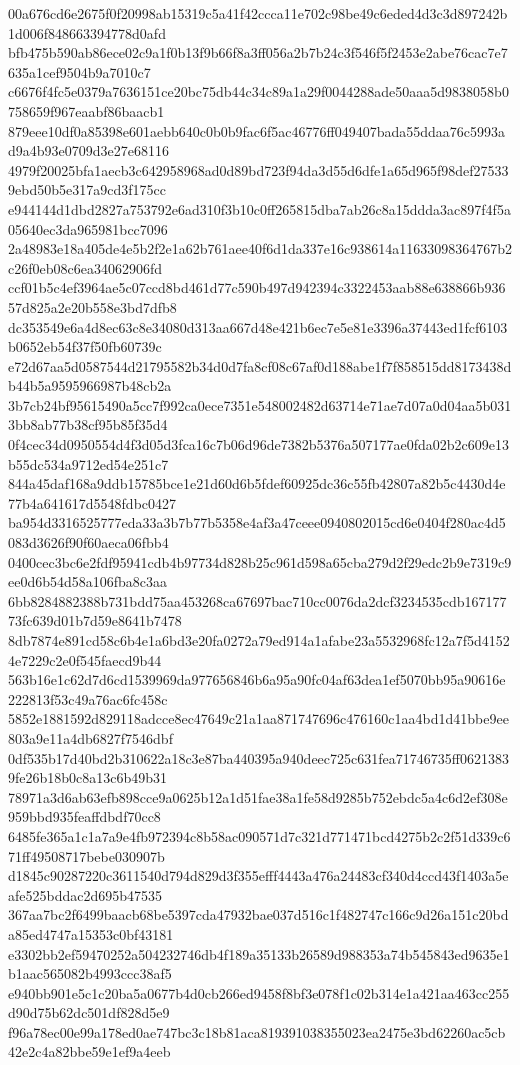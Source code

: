 {00a676cd6e2675f0f20998ab15319c5a41f42ccca11e702c98be49c6eded4d3c3d897242b1d006f848663394778d0afd
bfb475b590ab86ece02c9a1f0b13f9b66f8a3ff056a2b7b24c3f546f5f2453e2abe76cac7e7635a1cef9504b9a7010c7
c6676f4fc5e0379a7636151ce20bc75db44c34c89a1a29f0044288ade50aaa5d9838058b0758659f967eaabf86baacb1
879eee10df0a85398e601aebb640c0b0b9fac6f5ac46776ff049407bada55ddaa76c5993ad9a4b93e0709d3e27e68116
4979f20025bfa1aecb3c642958968ad0d89bd723f94da3d55d6dfe1a65d965f98def275339ebd50b5e317a9cd3f175cc
e944144d1dbd2827a753792e6ad310f3b10c0ff265815dba7ab26c8a15ddda3ac897f4f5a05640ec3da965981bcc7096
2a48983e18a405de4e5b2f2e1a62b761aee40f6d1da337e16c938614a11633098364767b2c26f0eb08c6ea34062906fd
ccf01b5c4ef3964ae5c07ccd8bd461d77c590b497d942394c3322453aab88e638866b93657d825a2e20b558e3bd7dfb8
dc353549e6a4d8ec63c8e34080d313aa667d48e421b6ec7e5e81e3396a37443ed1fcf6103b0652eb54f37f50fb60739c
e72d67aa5d0587544d21795582b34d0d7fa8cf08c67af0d188abe1f7f858515dd8173438db44b5a9595966987b48cb2a
3b7cb24bf95615490a5cc7f992ca0ece7351e548002482d63714e71ae7d07a0d04aa5b0313bb8ab77b38cf95b85f35d4
0f4cec34d0950554d4f3d05d3fca16c7b06d96de7382b5376a507177ae0fda02b2c609e13b55dc534a9712ed54e251c7
844a45daf168a9ddb15785bce1e21d60d6b5fdef60925dc36c55fb42807a82b5c4430d4e77b4a641617d5548fdbc0427
ba954d3316525777eda33a3b7b77b5358e4af3a47ceee0940802015cd6e0404f280ac4d5083d3626f90f60aeca06fbb4
0400cec3bc6e2fdf95941cdb4b97734d828b25c961d598a65cba279d2f29edc2b9e7319c9ee0d6b54d58a106fba8c3aa
6bb8284882388b731bdd75aa453268ca67697bac710cc0076da2dcf3234535cdb16717773fc639d01b7d59e8641b7478
8db7874e891cd58c6b4e1a6bd3e20fa0272a79ed914a1afabe23a5532968fc12a7f5d41524e7229c2e0f545faecd9b44
563b16e1c62d7d6cd1539969da977656846b6a95a90fc04af63dea1ef5070bb95a90616e222813f53c49a76ac6fc458c
5852e1881592d829118adcce8ec47649c21a1aa871747696c476160c1aa4bd1d41bbe9ee803a9e11a4db6827f7546dbf
0df535b17d40bd2b310622a18c3e87ba440395a940deec725c631fea71746735ff06213839fe26b18b0c8a13c6b49b31
78971a3d6ab63efb898cce9a0625b12a1d51fae38a1fe58d9285b752ebdc5a4c6d2ef308e959bbd935feaffdbdf70cc8
6485fe365a1c1a7a9e4fb972394c8b58ac090571d7c321d771471bcd4275b2c2f51d339c671ff49508717bebe030907b
d1845c90287220c3611540d794d829d3f355efff4443a476a24483cf340d4ccd43f1403a5eafe525bddac2d695b47535
367aa7bc2f6499baacb68be5397cda47932bae037d516c1f482747c166c9d26a151c20bda85ed4747a15353c0bf43181
e3302bb2ef59470252a504232746db4f189a35133b26589d988353a74b545843ed9635e1b1aac565082b4993ccc38af5
e940bb901e5c1c20ba5a0677b4d0cb266ed9458f8bf3e078f1c02b314e1a421aa463cc255d90d75b62dc501df828d5e9
f96a78ec00e99a178ed0ae747bc3c18b81aca819391038355023ea2475e3bd62260ac5cb42e2c4a82bbe59e1ef9a4eeb
}
